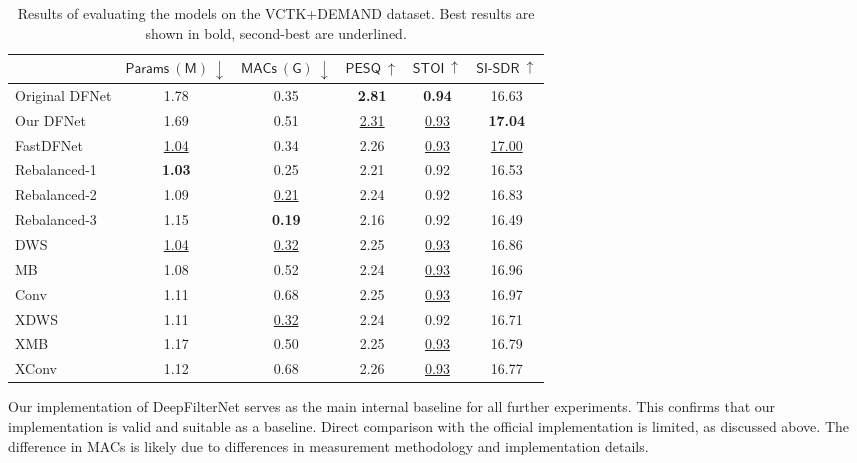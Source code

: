 \documentclass[a4paper,12pt]{extarticle}
\begin{document}
\begin{table}[h]
	\caption{Results of evaluating the models on the VCTK+DEMAND dataset. Best results are shown in bold, second-best are underlined.}
	\label{table:results}
	\footnotesize
	\centering
	\begin{tabular}{lccccc}
	\toprule
	& $\mathsf{Params\ (M)\ \downarrow}$ 
	& $\mathsf{MACs\ (G)\ \downarrow}$ 
	& $\mathsf{PESQ\ \uparrow}$ 
	& $\mathsf{STOI\ \uparrow}$ 
	& $\mathsf{SI\text{-}SDR\ \uparrow}$\\
	\midrule
	Original DFNet & 1.78      & 0.35      & \bf{2.81} & \bf{0.94} & 16.63     \\
	\midrule
	Our DFNet      & 1.69      & 0.51      & \underline{2.31} & \underline{0.93} & \bf{17.04} \\
	FastDFNet      & \underline{1.04} & 0.34      & 2.26      & \underline{0.93} & \underline{17.00}      \\
	Rebalanced-1   & \bf{1.03} & 0.25      & 2.21      & 0.92 & 16.53      \\
	Rebalanced-2   & 1.09      & \underline{0.21} & 2.24      & 0.92 & 16.83      \\
	Rebalanced-3   & 1.15      & \bf{0.19} & 2.16      & 0.92 & 16.49      \\
	\midrule
	DWS       & \underline{1.04} & \underline{0.32} & 2.25      & \underline{0.93} & 16.86      \\
	MB        & 1.08      & 0.52      & 2.24      & \underline{0.93} & 16.96      \\
	Conv      & 1.11      & 0.68      & 2.25      & \underline{0.93} & 16.97      \\
	\midrule
	XDWS      & 1.11      & \underline{0.32} & 2.24      & 0.92 & 16.71      \\
	XMB       & 1.17      & 0.50      & 2.25      & \underline{0.93} & 16.79      \\
	XConv     & 1.12      & 0.68      & 2.26      & \underline{0.93} & 16.77      \\
	\bottomrule
	\end{tabular}
\end{table}

Our implementation of DeepFilterNet serves as the main internal baseline for all further experiments. This confirms that our
implementation is valid and suitable as a baseline. Direct comparison with the official implementation is
limited, as discussed above.
The difference in MACs is likely due to differences in measurement methodology and implementation details.
\end{document}
